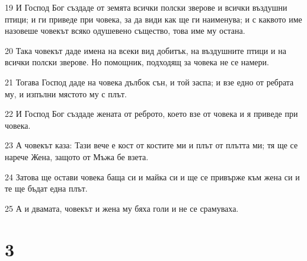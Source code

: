 \par 19 И Господ Бог създаде от земята всички полски зверове и всички въздушни птици; и ги приведе при човека, за да види как ще ги наименува; и с каквото име назовеше човекът всяко одушевено същество, това име му остана.
\par 20 Така човекът даде имена на всеки вид добитък, на въздушните птици и на всички полски зверове. Но помощник, подходящ за човека не се намери.
\par 21 Тогава Господ даде на човека дълбок сън, и той заспа; и взе едно от ребрата му, и изпълни мястото му с плът.
\par 22 И Господ Бог създаде жената от реброто, което взе от човека и я приведе при човека.
\par 23 А човекът каза: Тази вече е кост от костите ми и плът от плътта ми; тя ще се нарече Жена, защото от Мъжа бе взета.
\par 24 Затова ще остави човека баща си и майка си и ще се привърже към жена си и те ще бъдат една плът.
\par 25 А и двамата, човекът и жена му бяха голи и не се срамуваха.

\chapter{3}

